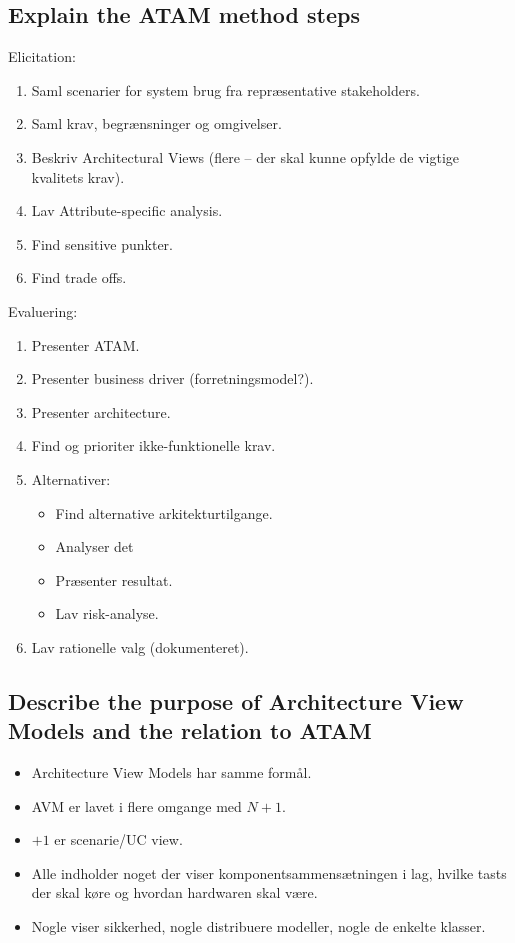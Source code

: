 \documentclass{article}
\begin{document}
\subsection{Explain the ATAM method steps}

Elicitation:
\vspace{-10pt}
\begin{enumerate}
	\item Saml scenarier for system brug fra repræsentative stakeholders.
	\item Saml krav, begrænsninger og omgivelser.
	\item Beskriv Architectural Views (flere -- der skal kunne opfylde de vigtige kvalitets krav).
	\item Lav Attribute-specific analysis.
	\item Find sensitive punkter.
	\item Find trade offs.
\end{enumerate}

Evaluering:
\vspace{-10pt}
\begin{enumerate}
	\item Presenter ATAM.
	\item Presenter business driver (forretningsmodel?).
	\item Presenter architecture.
	\item Find og prioriter ikke-funktionelle krav.
	\item Alternativer:
	\begin{itemize}
	 	\item Find alternative arkitekturtilgange.	
	 	\item Analyser det
		\item Præsenter resultat.
		\item Lav risk-analyse.
	 \end{itemize} 

	\item Lav rationelle valg (dokumenteret).
\end{enumerate}

\subsection{Describe the purpose of Architecture View Models and the relation to ATAM}

\begin{itemize}
	\item Architecture View Models har samme formål.
	\item AVM er lavet i flere omgange med $N+1$.
	\item $+1$ er scenarie/UC view.
	\item Alle indholder noget der viser komponentsammensætningen i lag, hvilke tasts der skal køre og hvordan hardwaren skal være.
	\item Nogle viser sikkerhed, nogle distribuere modeller, nogle de enkelte klasser.
\end{itemize}
\end{document}
